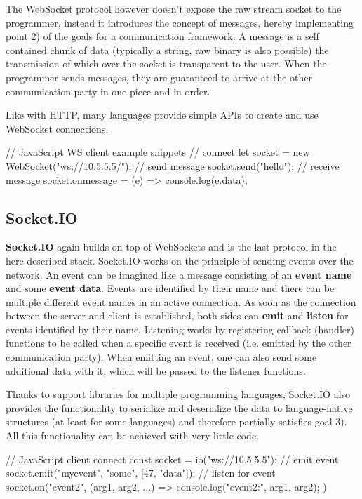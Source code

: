 \documentclass[conference]{IEEEtran}
\begin{document}
The WebSocket protocol however doesn't expose the raw stream socket to the programmer, instead it introduces the concept of messages, hereby implementing point 2) of the goals for a communication framework. A message is a self contained chunk of data (typically a string, raw binary is also possible) the transmission of which over the socket is transparent to the user. When the programmer sends messages, they are guaranteed to arrive at the other communication party in one piece and in order. \cite{b3}

Like with HTTP, many languages provide simple APIs to create and use WebSocket connections.

\begin{code-js}
// JavaScript WS client example snippets
// connect
let socket = new WebSocket("ws://10.5.5.5/");
// send message
socket.send("hello");
// receive message
socket.onmessage = (e) => {
    console.log(e.data);
}
\end{code-js}
\cite{ws-client-mdn}


\subsection{Socket.IO}

\textbf{Socket.IO} again builds on top of WebSockets and is the last protocol in the here-described stack. Socket.IO works on the principle of sending events over the network. An event can be imagined like a message consisting of an \textbf{event name} and some \textbf{event data}. Events are identified by their name and there can be multiple different event names in an active connection. As soon as the connection between the server and client is established, both sides can \textbf{emit} and \textbf{listen} for events identified by their name. Listening works by registering callback (handler) functions to be called when a specific event is received (i.e. emitted by the other communication party). When emitting an event, one can also send some additional data with it, which will be passed to the listener functions. \cite{b1}

Thanks to support libraries for multiple programming languages, Socket.IO also provides the functionality to serialize and deserialize the data to language-native structures (at least for some languages) and therefore partially satisfies goal 3). All this functionality can be achieved with very little code.

\begin{code-js}
// JavaScript client connect
const socket = io("ws://10.5.5.5");
// emit event
socket.emit("myevent", "some", [47, "data"]);
// listen for event
socket.on("event2", (arg1, arg2, ...) => {
    console.log("event2:", arg1, arg2);
})
\end{code-js}
\end{document}
